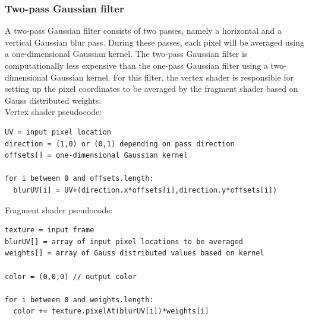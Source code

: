 \documentclass[11pt,a4paper,twoside,openright]{report}
\begin{document}
\subsubsection{Two-pass Gaussian filter}
A two-pass Gaussian filter consists of two passes, namely a horizontal and a vertical Gaussian blur pass. During these passes, each pixel will be averaged using a one-dimensional Gaussian kernel. The two-pass Gaussian filter is computationally less expensive than the one-pass Gaussian filter using a two-dimensional Gaussian kernel. For this filter, the vertex shader is responsible for setting up the pixel coordinates to be averaged by the fragment shader based on Gauss distributed weights.
\\
Vertex shader pseudocode:
\begin{lstlisting}[caption=Two-pass Gaussian filter vertex shader]
UV = input pixel location
direction = (1,0) or (0,1) depending on pass direction
offsets[] = one-dimensional Gaussian kernel

for i between 0 and offsets.length:
  blurUV[i] = UV+(direction.x*offsets[i],direction.y*offsets[i])
\end{lstlisting}
Fragment shader pseudocode:
\begin{lstlisting}[caption=Two-pass Gaussian filter fragment shader]
texture = input frame
blurUV[] = array of input pixel locations to be averaged
weights[] = array of Gauss distributed values based on kernel

color = (0,0,0) // output color

for i between 0 and weights.length:
  color += texture.pixelAt(blurUV[i])*weights[i]
\end{lstlisting}
\end{document}
